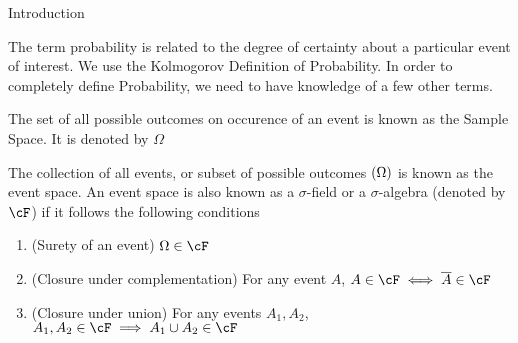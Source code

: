 \documentclass{article}
\begin{document}
\makeheader%

\begin{ssection}{Introduction}

	The term probability is related to the degree of certainty about a particular event of interest. We use the Kolmogorov Definition of Probability. In order to completely define Probability, we need to have knowledge of a few other terms.

	\begin{definition}
		The set of all possible outcomes on occurence of an event is known as the Sample Space. It is denoted by $\Omega$
		\label{def:sample_space}
	\end{definition}

	\begin{definition}
		The collection of all events, or subset of possible outcomes $\left( {\Omega} \right)$ is known as the event space. An event space is also known as a $\sigma$-field or a $\sigma$-algebra (denoted by $\cF$) if it follows the following conditions

		\begin{enumerate}
			\item (Surety of an event) $\Omega \in \cF$
			\item (Closure under complementation) For any event $A$, $A \in \cF \iff \compl{A} \in \cF$
			\item (Closure under union) For any events $A_1, A_2$, $A_1, A_2 \in \cF \implies A_1 \cup A_2 \in \cF$
		\end{enumerate}
		\label{def:event_space}
	\end{definition}


\end{ssection}
\end{document}
